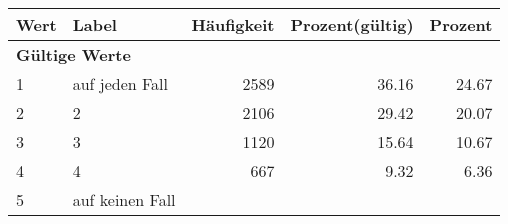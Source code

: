      \begin{longtable}{lXrrr}
     \toprule
     \textbf{Wert} & \textbf{Label} & \textbf{Häufigkeit} & \textbf{Prozent(gültig)} & \textbf{Prozent} \\
     \endhead
     \midrule
     \multicolumn{5}{l}{\textbf{Gültige Werte}}\\

     1 &
     \multicolumn{1}{X}{ auf jeden Fall   } &


       \num{2589} &
       \num[round-mode=places,round-precision=2]{36,16} &
         \num[round-mode=places,round-precision=2]{24,67} \\

     2 &
     \multicolumn{1}{X}{ 2   } &


       \num{2106} &
       \num[round-mode=places,round-precision=2]{29,42} &
         \num[round-mode=places,round-precision=2]{20,07} \\

     3 &
     \multicolumn{1}{X}{ 3   } &


       \num{1120} &
       \num[round-mode=places,round-precision=2]{15,64} &
         \num[round-mode=places,round-precision=2]{10,67} \\

     4 &
     \multicolumn{1}{X}{ 4   } &


       \num{667} &
       \num[round-mode=places,round-precision=2]{9,32} &
         \num[round-mode=places,round-precision=2]{6,36} \\

     5 &
     \multicolumn{1}{X}{ auf keinen Fall   } &



\end{longtable}
